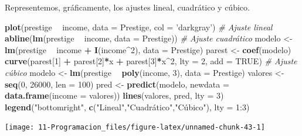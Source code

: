 \documentclass[]{book}
\newenvironment{Shaded}{\begin{snugshade}}{\end{snugshade}}
\newcommand{\CommentTok}[1]{\textcolor[rgb]{0.56,0.35,0.01}{\textit{#1}}}
\newcommand{\DataTypeTok}[1]{\textcolor[rgb]{0.13,0.29,0.53}{#1}}
\newcommand{\DecValTok}[1]{\textcolor[rgb]{0.00,0.00,0.81}{#1}}
\newcommand{\KeywordTok}[1]{\textcolor[rgb]{0.13,0.29,0.53}{\textbf{#1}}}
\newcommand{\NormalTok}[1]{#1}
\newcommand{\OperatorTok}[1]{\textcolor[rgb]{0.81,0.36,0.00}{\textbf{#1}}}
\newcommand{\OtherTok}[1]{\textcolor[rgb]{0.56,0.35,0.01}{#1}}
\newcommand{\StringTok}[1]{\textcolor[rgb]{0.31,0.60,0.02}{#1}}
\begin{document}
Representemos, gráficamente, los ajustes lineal, cuadrático y cúbico.

\begin{Shaded}
\begin{Highlighting}[]
\KeywordTok{plot}\NormalTok{(prestige }\OperatorTok{~}\StringTok{ }\NormalTok{income, }\DataTypeTok{data =}\NormalTok{ Prestige, }\DataTypeTok{col =} \StringTok{'darkgray'}\NormalTok{)}
\CommentTok{# Ajuste lineal}
\KeywordTok{abline}\NormalTok{(}\KeywordTok{lm}\NormalTok{(prestige }\OperatorTok{~}\StringTok{ }\NormalTok{income, }\DataTypeTok{data =}\NormalTok{ Prestige))}
\CommentTok{# Ajuste cuadrático}
\NormalTok{modelo <-}\StringTok{ }\KeywordTok{lm}\NormalTok{(prestige }\OperatorTok{~}\StringTok{ }\NormalTok{income }\OperatorTok{+}\StringTok{ }\KeywordTok{I}\NormalTok{(income}\OperatorTok{^}\DecValTok{2}\NormalTok{), }\DataTypeTok{data =}\NormalTok{ Prestige)}
\NormalTok{parest <-}\StringTok{ }\KeywordTok{coef}\NormalTok{(modelo)}
\KeywordTok{curve}\NormalTok{(parest[}\DecValTok{1}\NormalTok{] }\OperatorTok{+}\StringTok{ }\NormalTok{parest[}\DecValTok{2}\NormalTok{]}\OperatorTok{*}\NormalTok{x }\OperatorTok{+}\StringTok{ }\NormalTok{parest[}\DecValTok{3}\NormalTok{]}\OperatorTok{*}\NormalTok{x}\OperatorTok{^}\DecValTok{2}\NormalTok{, }\DataTypeTok{lty =} \DecValTok{2}\NormalTok{, }\DataTypeTok{add =} \OtherTok{TRUE}\NormalTok{)}
\CommentTok{# Ajuste cúbico}
\NormalTok{modelo <-}\StringTok{ }\KeywordTok{lm}\NormalTok{(prestige }\OperatorTok{~}\StringTok{ }\KeywordTok{poly}\NormalTok{(income, }\DecValTok{3}\NormalTok{), }\DataTypeTok{data =}\NormalTok{ Prestige)}
\NormalTok{valores <-}\StringTok{ }\KeywordTok{seq}\NormalTok{(}\DecValTok{0}\NormalTok{, }\DecValTok{26000}\NormalTok{, }\DataTypeTok{len =} \DecValTok{100}\NormalTok{)}
\NormalTok{pred <-}\StringTok{ }\KeywordTok{predict}\NormalTok{(modelo, }\DataTypeTok{newdata =} \KeywordTok{data.frame}\NormalTok{(}\DataTypeTok{income =}\NormalTok{ valores))}
\KeywordTok{lines}\NormalTok{(valores, pred, }\DataTypeTok{lty =} \DecValTok{3}\NormalTok{)}
\KeywordTok{legend}\NormalTok{(}\StringTok{"bottomright"}\NormalTok{, }\KeywordTok{c}\NormalTok{(}\StringTok{"Lineal"}\NormalTok{,}\StringTok{"Cuadrático"}\NormalTok{,}\StringTok{"Cúbico"), lty = 1:3)}
\end{Highlighting}
\end{Shaded}

\begin{center}\texttt{[image: 11-Programacion\_files/figure-latex/unnamed-chunk-43-1]} \end{center}
\end{document}
